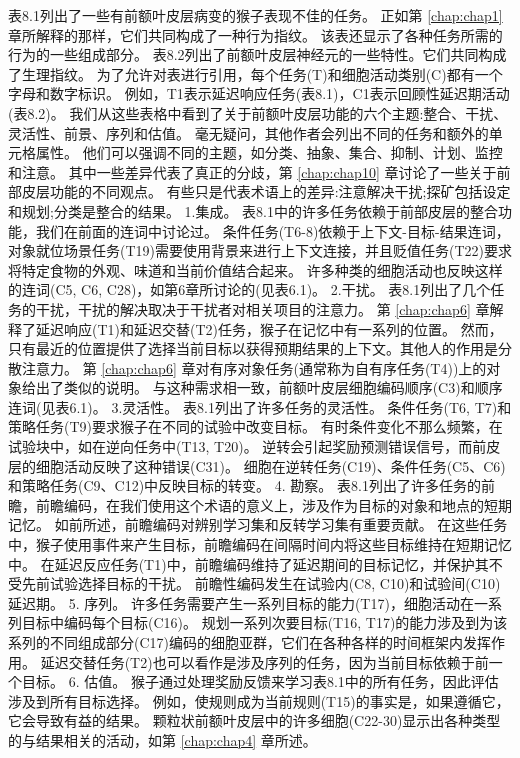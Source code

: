表8.1列出了一些有前额叶皮层病变的猴子表现不佳的任务。
正如第 \ref{chap:chap1} 章所解释的那样，它们共同构成了一种行为指纹。
该表还显示了各种任务所需的行为的一些组成部分。
表8.2列出了前额叶皮层神经元的一些特性。它们共同构成了生理指纹。
为了允许对表进行引用，每个任务(T)和细胞活动类别(C)都有一个字母和数字标识。
例如，T1表示延迟响应任务(表8.1)，C1表示回顾性延迟期活动(表8.2)。
我们从这些表格中看到了关于前额叶皮层功能的六个主题:整合、干扰、灵活性、前景、序列和估值。
毫无疑问，其他作者会列出不同的任务和额外的单元格属性。
他们可以强调不同的主题，如分类、抽象、集合、抑制、计划、监控和注意。
其中一些差异代表了真正的分歧，第 \ref{chap:chap10} 章讨论了一些关于前部皮层功能的不同观点。
有些只是代表术语上的差异:注意解决干扰;探矿包括设定和规划;分类是整合的结果。
1.集成。
表8.1中的许多任务依赖于前部皮层的整合功能，我们在前面的连词中讨论过。
条件任务(T6-8)依赖于上下文-目标-结果连词，对象就位场景任务(T19)需要使用背景来进行上下文连接，并且贬值任务(T22)要求将特定食物的外观、味道和当前价值结合起来。
许多种类的细胞活动也反映这样的连词(C5, C6, C28)，如第6章所讨论的(见表6.1)。
2.干扰。
表8.1列出了几个任务的干扰，干扰的解决取决于干扰者对相关项目的注意力。
第 \ref{chap:chap6} 章解释了延迟响应(T1)和延迟交替(T2)任务，猴子在记忆中有一系列的位置。
然而，只有最近的位置提供了选择当前目标以获得预期结果的上下文。其他人的作用是分散注意力。
第 \ref{chap:chap6} 章对有序对象任务(通常称为自有序任务(T4))上的对象给出了类似的说明。
与这种需求相一致，前额叶皮层细胞编码顺序(C3)和顺序连词(见表6.1)。
3.灵活性。
表8.1列出了许多任务的灵活性。
条件任务(T6, T7)和策略任务(T9)要求猴子在不同的试验中改变目标。
有时条件变化不那么频繁，在试验块中，如在逆向任务中(T13, T20)。
逆转会引起奖励预测错误信号，而前皮层的细胞活动反映了这种错误(C31)。
细胞在逆转任务(C19)、条件任务(C5、C6)和策略任务(C9、C12)中反映目标的转变。
4. 勘察。
表8.1列出了许多任务的前瞻，前瞻编码，在我们使用这个术语的意义上，涉及作为目标的对象和地点的短期记忆。
如前所述，前瞻编码对辨别学习集和反转学习集有重要贡献。
在这些任务中，猴子使用事件来产生目标，前瞻编码在间隔时间内将这些目标维持在短期记忆中。
在延迟反应任务(T1)中，前瞻编码维持了延迟期间的目标记忆，并保护其不受先前试验选择目标的干扰。
前瞻性编码发生在试验内(C8, C10)和试验间(C10)延迟期。
5. 序列。
许多任务需要产生一系列目标的能力(T17)，细胞活动在一系列目标中编码每个目标(C16)。
规划一系列次要目标(T16, T17)的能力涉及到为该系列的不同组成部分(C17)编码的细胞亚群，它们在各种各样的时间框架内发挥作用。
延迟交替任务(T2)也可以看作是涉及序列的任务，因为当前目标依赖于前一个目标。
6. 估值。
猴子通过处理奖励反馈来学习表8.1中的所有任务，因此评估涉及到所有目标选择。
例如，使规则成为当前规则(T15)的事实是，如果遵循它，它会导致有益的结果。
颗粒状前额叶皮层中的许多细胞(C22-30)显示出各种类型的与结果相关的活动，如第 \ref{chap:chap4} 章所述。



